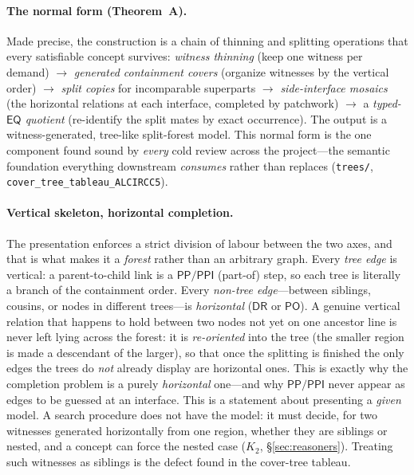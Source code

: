 \documentclass[11pt]{article}
\newcommand{\DR}{\mathsf{DR}}
\newcommand{\PO}{\mathsf{PO}}
\newcommand{\PP}{\mathsf{PP}}
\newcommand{\PPI}{\mathsf{PPI}}
\newcommand{\EQ}{\mathsf{EQ}}
\theoremstyle{plain}
\theoremstyle{definition}
\begin{document}
\paragraph{The normal form (Theorem~A).} Made precise, the construction is
a chain of thinning and splitting operations that every satisfiable
concept survives: \emph{witness thinning} (keep one witness per demand)
$\to$ \emph{generated containment covers} (organize witnesses by the
vertical order) $\to$ \emph{split copies} for incomparable superparts
$\to$ \emph{side-interface mosaics} (the horizontal relations at each
interface, completed by patchwork) $\to$ a \emph{typed-$\EQ$ quotient}
(re-identify the split mates by exact occurrence). The output is a
witness-generated, tree-like split-forest model. This normal form is the
one component found sound by \emph{every} cold review across the
project---the semantic foundation everything downstream \emph{consumes}
rather than replaces (\texttt{trees/},
\texttt{cover\_tree\_tableau\_ALCIRCC5}).

\paragraph{Vertical skeleton, horizontal completion.} The presentation
enforces a strict division of labour between the two axes, and that is what
makes it a \emph{forest} rather than an arbitrary graph. Every \emph{tree
edge} is vertical: a parent-to-child link is a $\PP/\PPI$ (part-of) step,
so each tree is literally a branch of the containment order. Every
\emph{non-tree edge}---between siblings, cousins, or nodes in different
trees---is \emph{horizontal} ($\DR$ or $\PO$). A genuine vertical relation
that happens to hold between two nodes not yet on one ancestor line is never
left lying across the forest: it is \emph{re-oriented} into the tree (the
smaller region is made a descendant of the larger), so that once the
splitting is finished the only edges the trees do \emph{not} already display
are horizontal ones. This is exactly why the completion problem is a purely
\emph{horizontal} one---and why $\PP/\PPI$ never appear as edges to be
guessed at an interface. This is a statement about presenting a \emph{given}
model. A search procedure does not have the model: it must decide, for two
witnesses generated horizontally from one region, whether they are siblings or
nested, and a concept can force the nested case ($K_2$,
\S\ref{sec:reasoners}). Treating such witnesses as siblings is the defect
found in the cover-tree tableau.
\end{document}
